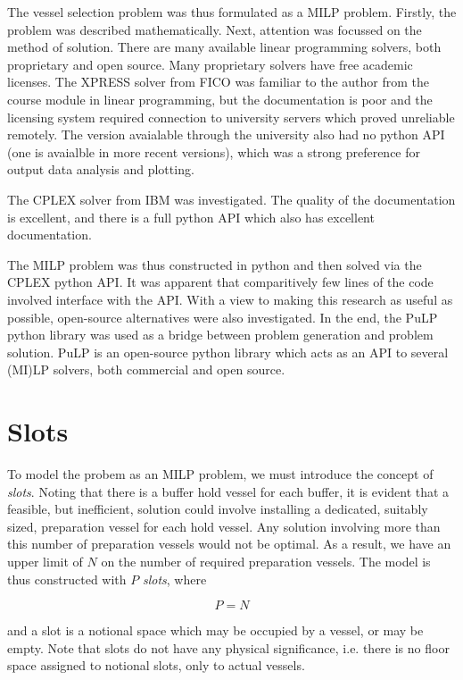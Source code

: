 The vessel selection problem was thus formulated as a MILP problem.
Firstly, the problem was described mathematically.
Next, attention was focussed on the method of solution.  
There are many available linear programming solvers, both proprietary and open
source.
Many proprietary solvers have free academic licenses.
The XPRESS solver from FICO was familiar to the author from the course module
in linear programming, but the documentation is poor and the licensing system
required connection to university servers which proved unreliable remotely.
The version avaialable through the university also had no python API (one is
avaialble in more recent versions), which was a strong preference for output
data analysis and plotting.

The CPLEX solver from IBM was investigated.  
The quality of the documentation is excellent, and there is a full python API
which also has excellent documentation.

The MILP problem was thus constructed in python and then solved via the CPLEX
python API.
It was apparent that comparitively few lines of the code involved interface
with the API.
With a view to making this research as useful as possible, open-source
alternatives were also investigated.
In the end, the PuLP python library was used as a bridge between problem
generation and problem solution.
PuLP is an open-source python library which acts as an API to several
(MI)LP solvers, both commercial and open source.

\section{Slots}\label{S.slots}

To model the probem as an MILP problem, we must introduce the concept of
\emph{slots}.
Noting that there is a buffer hold vessel for each buffer, it is evident that 
a feasible, but inefficient, solution could involve installing a dedicated,
suitably sized, preparation vessel for each hold vessel.  
Any solution involving more than this number of preparation vessels would not
be optimal.
As a result, we have an upper limit of $N$ on the number of required
preparation vessels.
The model is thus constructed with $P$ \emph{slots}, where

\begin{equation}
    P = N
\end{equation}

and a slot is a notional space which may be occupied by a vessel, or may be
empty.
Note that slots do not have any physical significance, i.e. there is no floor
space assigned to notional slots, only to actual vessels.

